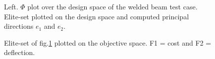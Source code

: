 \begin{figure}[h!]
\begin{minipage}[b]{1\linewidth}
 \centering
\end{minipage}
\caption{Left. $\Phi$ plot over the design space of the welded beam test case. Elite-set plotted on the design space and computed principal directions $e_1$ and $e_2$.} 
\label{reco1}
\end{figure}

\begin{figure}[h!]
\begin{minipage}[b]{1\linewidth}
 \centering
\end{minipage}
\caption{Elite-set of fig.\ref{reco1} plotted on the objective space. F1 = cost and F2 = deflection.} 
\label{Pareto1}
\end{figure}


